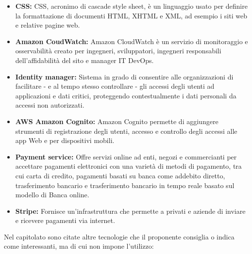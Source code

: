 \begin{itemize}
    \item \textbf{CSS:} CSS, acronimo di cascade style sheet, è un linguaggio usato per definire la formattazione di documenti HTML, XHTML e XML, ad esempio i siti web e relative pagine web.
    \item \textbf{Amazon CoudWatch:} Amazon CloudWatch è un servizio di monitoraggio e osservabilità creato per ingegneri, sviluppatori, ingegneri responsabili dell'affidabilità del sito e manager IT DevOps.
    \item \textbf{Identity manager:} Sistema in grado di consentire alle organizzazioni di facilitare - e al tempo stesso controllare - gli accessi degli utenti ad applicazioni e dati critici, proteggendo contestualmente i dati personali da accessi non autorizzati.
    \item \textbf{AWS Amazon Cognito:} Amazon Cognito permette di aggiungere strumenti di registrazione degli utenti, accesso e controllo degli accessi alle app Web e per dispositivi mobili.
    \item \textbf{Payment service:} Offre servizi online ad enti, negozi e commercianti per accettare pagamenti elettronici con una varietà di metodi di pagamento, tra cui carta di credito, pagamenti basati su banca come addebito diretto, trasferimento bancario e trasferimento bancario in tempo reale basato sul modello di Banca online.
    \item \textbf{Stripe:} Fornisce un’infrastruttura che permette a privati e aziende di inviare e ricevere pagamenti via internet.
\end{itemize}
Nel capitolato sono citate altre tecnologie che il proponente consiglia o indica come interessanti, ma di cui non impone l'utilizzo:
